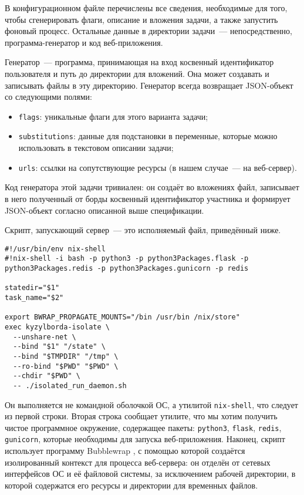 В конфигурационном файле перечислены все сведения, необходимые для того, чтобы сгенерировать флаги, описание и вложения задачи, а также запустить фоновый процесс. Остальные данные в директории задачи~--- непосредственно, программа-генератор и код веб-приложения.

Генератор~--- программа, принимающая на вход косвенный идентификатор пользователя и путь до директории для вложений. Она может создавать и записывать файлы в эту директорию. Генератор всегда возвращает JSON-объект со следующими полями:

\begin{itemize}
\item \texttt{flags}: уникальные флаги для этого варианта задачи;
\item \texttt{substitutions}: данные для подстановки в переменные, которые можно использовать в текстовом описании задачи;
\item \texttt{urls}:  ссылки на сопутствующие ресурсы (в нашем случае~--- на веб-сервер).
\end{itemize}

Код генератора этой задачи тривиален: он создаёт во вложениях файл, записывает в него полученный от борды косвенный идентификатор участника и формирует JSON-объект согласно описанной выше спецификации.

Скрипт, запускающий сервер~--- это исполняемый файл, приведённый ниже.

\begin{lstlisting}[caption={Скрипт, запускающий сервер}]
#!/usr/bin/env nix-shell
#!nix-shell -i bash -p python3 -p python3Packages.flask -p python3Packages.redis -p python3Packages.gunicorn -p redis

statedir="$1"
task_name="$2"

export BWRAP_PROPAGATE_MOUNTS="/bin /usr/bin /nix/store"
exec kyzylborda-isolate \
  --unshare-net \
  --bind "$1" "/state" \
  --bind "$TMPDIR" "/tmp" \
  --ro-bind "$PWD" "$PWD" \
  --chdir "$PWD" \
  -- ./isolated_run_daemon.sh
\end{lstlisting}

Он выполняется не командной оболочкой ОС, а утилитой \texttt{nix-shell}, что следует из первой строки. Вторая строка сообщает утилите, что мы хотим получить чистое программное окружение, содержащее пакеты: \texttt{python3}, \texttt{flask}, \texttt{redis}, \texttt{gunicorn}, которые необходимы для запуска веб-приложения. Наконец, скрипт использует программу Bubblewrap \cite{Bubblewrap}, с помощью которой создаётся изолированный контекст для процесса веб-сервера: он отделён от сетевых интерфейсов ОС и её файловой системы, за исключением рабочей директории, в которой содержатся его ресурсы и директории для временных файлов.

